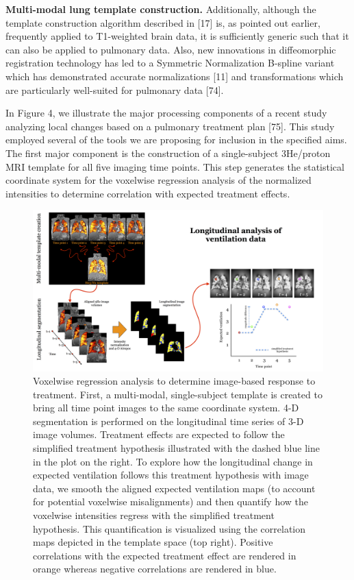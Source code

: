 \documentclass[11pt,]{article}
\begin{document}
\textbf{Multi-modal lung template construction.} Additionally, although
the template construction algorithm described in {[}17{]} is, as pointed
out earlier, frequently applied to T1-weighted brain data, it is
sufficiently generic such that it can also be applied to pulmonary data.
Also, new innovations in diffeomorphic registration technology has led
to a Symmetric Normalization B-spline variant which has demonstrated
accurate normalizations {[}11{]} and transformations which are
particularly well-suited for pulmonary data {[}74{]}.

In Figure 4, we illustrate the major processing components of a recent
study analyzing local changes based on a pulmonary treatment plan
{[}75{]}. This study employed several of the tools we are proposing for
inclusion in the specified aims. The first major component is the
construction of a single-subject 3He/proton MRI template for all five
imaging time points. This step generates the statistical coordinate
system for the voxelwise regression analysis of the normalized
intensities to determine correlation with expected treatment effects.

\begin{figure}[htbp]
\centering
\includegraphics{Figs/longitudinalStudy.png}
\caption{Voxelwise regression analysis to determine image-based response
to treatment. First, a multi-modal, single-subject template is created
to bring all time point images to the same coordinate system. 4-D
segmentation is performed on the longitudinal time series of 3-D image
volumes. Treatment effects are expected to follow the simplified
treatment hypothesis illustrated with the dashed blue line in the plot
on the right. To explore how the longitudinal change in expected
ventilation follows this treatment hypothesis with image data, we smooth
the aligned expected ventilation maps (to account for potential
voxelwise misalignments) and then quantify how the voxelwise intensities
regress with the simplified treatment hypothesis. This quantification is
visualized using the correlation maps depicted in the template space
(top right). Positive correlations with the expected treatment effect
are rendered in orange whereas negative correlations are rendered in
blue.}
\end{figure}
\end{document}
